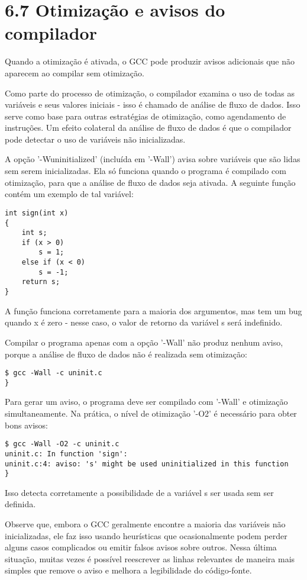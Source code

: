 \section{6.7 Otimização e avisos do compilador}

Quando a otimização é ativada, o GCC pode produzir avisos adicionais que não aparecem ao compilar sem otimização.

Como parte do processo de otimização, o compilador examina o uso de todas as variáveis e seus valores iniciais - isso é chamado de análise de fluxo de dados. Isso serve como base para outras estratégias de otimização, como agendamento de instruções. Um efeito colateral da análise de fluxo de dados é que o compilador pode detectar o uso de variáveis não inicializadas.

A opção '-Wuninitialized' (incluída em '-Wall') avisa sobre variáveis que são lidas sem serem inicializadas. Ela só funciona quando o programa é compilado com otimização, para que a análise de fluxo de dados seja ativada. A seguinte função contém um exemplo de tal variável:

\begin{scriptsize}
\estilobash
\begin{lstlisting}
int sign(int x)
{
    int s;
    if (x > 0)
        s = 1;
    else if (x < 0)
        s = -1;
    return s;
}\end{lstlisting}
\end{scriptsize}

A função funciona corretamente para a maioria dos argumentos, mas tem um bug quando x é zero - nesse caso, o valor de retorno da variável s será indefinido.

Compilar o programa apenas com a opção '-Wall' não produz nenhum aviso, porque a análise de fluxo de dados não é realizada sem otimização:

\begin{scriptsize}
\estilobash
\begin{lstlisting}
$ gcc -Wall -c uninit.c
}\end{lstlisting}
\end{scriptsize}

Para gerar um aviso, o programa deve ser compilado com '-Wall' e otimização simultaneamente. Na prática, o nível de otimização '-O2' é necessário para obter bons avisos:

\begin{scriptsize}
\estilobash
\begin{lstlisting}
$ gcc -Wall -O2 -c uninit.c
uninit.c: In function 'sign':
uninit.c:4: aviso: 's' might be used uninitialized in this function
}\end{lstlisting}
\end{scriptsize}


Isso detecta corretamente a possibilidade de a variável s ser usada sem ser definida.

Observe que, embora o GCC geralmente encontre a maioria das variáveis não inicializadas, ele faz isso usando heurísticas que ocasionalmente podem perder alguns casos complicados ou emitir falsos avisos sobre outros. Nessa última situação, muitas vezes é possível reescrever as linhas relevantes de maneira mais simples que remove o aviso e melhora a legibilidade do código-fonte.